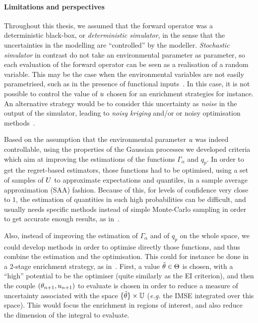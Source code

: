 \documentclass[../../Main_ManuscritThese.tex]{subfiles}
\begin{document}
\paragraph{Limitations and perspectives}
Throughout this thesis, we assumed that the forward operator was a
deterministic black-box, or \emph{deterministic simulator}, in the
sense that the uncertainties in the modelling are ``controlled'' by
the modeller. \emph{Stochastic simulator} in contrast do not take an
environmental parameter as parameter, so each evaluation of the
forward operator can be seen as a realisation of a random
variable. This may be the case when the environmental variables are
not easily parametrised, such as in the presence of functional
inputs~\cite{el_amri_analyse_2019}. In this case, it is not possible
to control the value of $u$ chosen for an enrichment strategies for
instance. An alternative strategy would be to consider this
uncertainty as \emph{noise} in the output of the simulator, leading to
\emph{noisy kriging} and/or or noisy optimisation
methods~\cite{picheny_noisy_2014}.

Based on the assumption that the environmental parameter $u$ was
indeed controllable, using the properties of the Gaussian processes we
developed criteria which aim at improving the estimations of the
functions $\Gamma_\alpha$ and $q_p$. In order to get the regret-based
estimators, those functions had to be optimised, using a set of
samples of $U$ to approximate expectations and quantiles, in a
sample average approximation (SAA) fashion. Because of this, for
levels of confidence very close to $1$, the estimation of quantities
in such high probabilities can be difficult, and usually needs
specific methods instead of simple Monte-Carlo sampling in order to
get accurate enough results, as in~\cite{razaaly_rare_2019}.

Also, instead of improving the estimation of $\Gamma_{\alpha}$ and of
$q_p$ on the whole space, we could develop methods in order to
optimise directly those functions, and thus combine the estimation and
the optimisation.  This could for instance be done in a $2$-stage
enrichment strategy, as
in~\cite{janusevskis_simultaneous_2010}. First, a value
$\tilde{\theta} \in \Theta$ is chosen, with a ``high'' potential to be
the optimiser (quite similarly as the EI criterion), and then the
couple $(\theta_{n+1}, u_{n+1})$ to evaluate is chosen in order to
reduce a measure of uncertainty associated with the space
$\{\tilde{\theta}\} \times \mathbb{U}$ (\emph{e.g.} the IMSE integrated over
this space). This would focus the enrichment in regions of interest,
and also reduce the dimension of the integral to evaluate.
\end{document}

